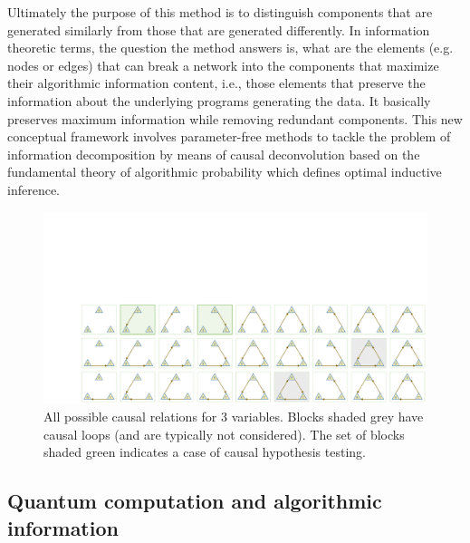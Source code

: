 \documentclass[%
 aps,
 jmp,%
 amsmath,amssymb,
 reprint,%
]{revtex4-2}
\begin{document}
Ultimately the purpose of this method is to distinguish components that are generated similarly from those that are generated differently. 
In information theoretic terms, the question the method answers is, what are the elements (e.g. nodes or edges) that can break a network into the components that maximize their algorithmic information content, i.e., those elements that preserve the information about the underlying programs generating the data.
It basically preserves maximum information while removing redundant components. 
This new conceptual framework involves parameter-free methods to tackle the problem of information decomposition by means of causal deconvolution based on the fundamental theory of algorithmic probability which defines optimal inductive inference.

\begin{figure}[t!]
	\centering %
	\includegraphics[clip, trim=3cm 0cm 0cm 9cm,width=\textwidth]{3vci.pdf}
	\caption{All possible causal relations for 3 variables. Blocks shaded grey have causal loops (and are typically not considered). The set of blocks shaded green indicates a case of causal hypothesis testing.}
	\label{fig:3vci}
\end{figure}

\subsection{Quantum computation and algorithmic information}
\end{document}
